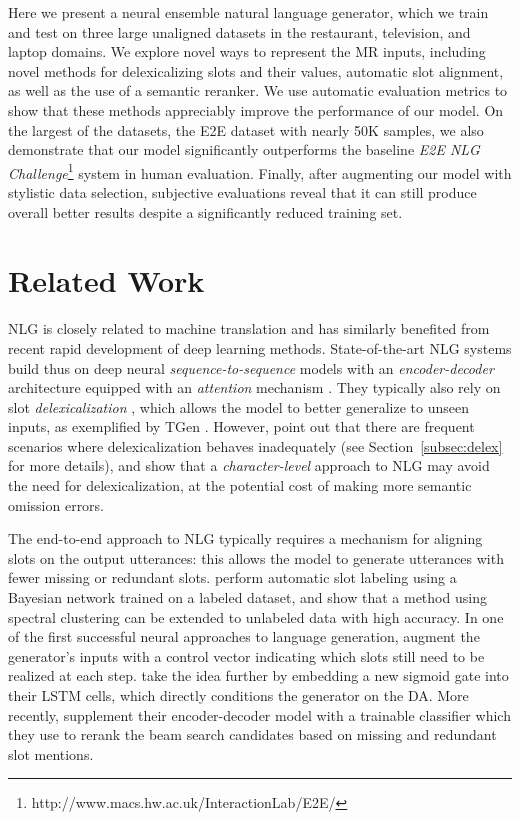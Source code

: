 \documentclass[11pt,a4paper]{article}
\begin{document}
Here we present a neural ensemble natural language generator, which we train and test on three large unaligned datasets in the restaurant, television, and laptop domains. We explore novel ways to represent the MR inputs, including novel methods for delexicalizing slots and their values, automatic slot alignment, as well as the use of a semantic reranker. We use automatic evaluation metrics to show that these methods appreciably improve the performance of our model. On the largest of the datasets, the E2E dataset \cite{novikova2017e2e} with nearly 50K samples, we also demonstrate that our model significantly outperforms the baseline \emph{E2E NLG Challenge}\footnote{http://www.macs.hw.ac.uk/InteractionLab/E2E/} system in human evaluation. Finally, after augmenting our model with stylistic data selection, subjective evaluations reveal that it can still produce overall better results despite a significantly reduced training set.





\section{Related Work}
\label{sec:related_work}


NLG is closely related to machine translation and has similarly benefited from recent rapid development of deep learning methods. State-of-the-art NLG systems build thus on deep neural \emph{sequence-to-sequence} models \cite{sutskever2014sequence} with an \emph{encoder-decoder} architecture \cite{cho2014learning} equipped with an \emph{attention} mechanism \cite{bahdanau2015neural}. They typically also rely on slot \emph{delexicalization} \cite{mairesse2010phrase, henderson2014robust}, which allows the model to better generalize to unseen inputs, as exemplified by TGen \cite{duvsek2016sequence}. However, \citet{nayak2017plan} point out that there are frequent scenarios where delexicalization behaves inadequately (see Section~\ref{subsec:delex} for more details), and \citet{agarwal2017surprisingly} show that a \emph{character-level} approach to NLG may avoid the need for delexicalization, at the potential cost of making more semantic omission errors.

The end-to-end approach to NLG typically requires a mechanism for aligning slots on the output utterances: this allows the model to generate utterances with fewer missing or redundant slots. \citet{cuayahuitl2014training} perform automatic slot labeling using a Bayesian network trained on a labeled dataset, and show that a method using spectral clustering can be extended to unlabeled data with high accuracy. In one of the first successful neural approaches to language generation, \citet{wen2015stochastic} augment the generator's inputs with a control vector indicating which slots still need to be realized at each step. \citet{wen2015semantically} take the idea further by embedding a new sigmoid gate into their LSTM cells, which directly conditions the generator on the DA. More recently, \citet{duvsek2016sequence} supplement their encoder-decoder model with a trainable classifier which they use to rerank the beam search candidates based on missing and redundant slot mentions.
\end{document}
